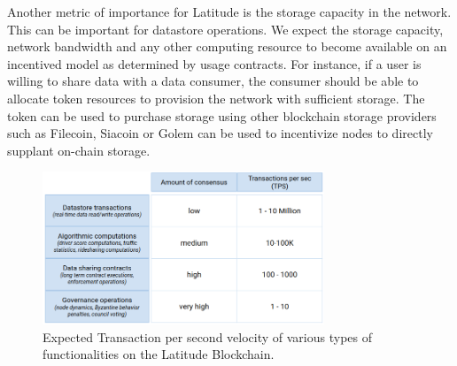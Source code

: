 Another metric of importance for Latitude is the storage capacity in the network. This can be important for
datastore operations. We expect the storage capacity, network bandwidth and any other computing resource to become
available on an incentived model as determined by usage contracts. For instance, if a user is willing to share data with
a data consumer, the consumer should be able to allocate token resources to provision the network with sufficient
storage. The token can be used to purchase storage using other blockchain storage providers such as Filecoin, Siacoin or
Golem can be used to incentivize nodes to directly supplant on-chain storage.

\begin{figure}[t]
    \centering
    \includegraphics[width=0.75\textwidth]{tps_lat2.png}
  \caption{Expected Transaction per second velocity of various types of functionalities on the Latitude Blockchain.}
    \label{fig:tps_lat}
\end{figure}

